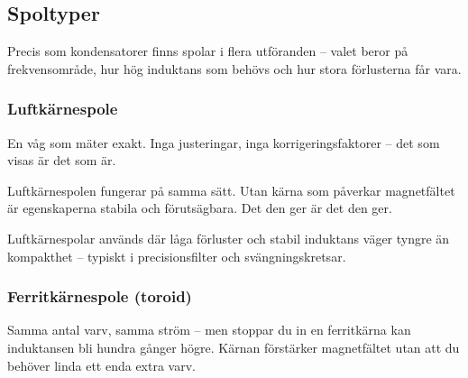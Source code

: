 \documentclass[a4paper,11pt,twoside]{book}
\newcommand{\emoji}[1]{{\emojifont #1}}
\begin{document}
\subsection{Spoltyper}

Precis som kondensatorer finns spolar i flera utföranden 
-- valet beror på frekvensområde, hur hög induktans som 
behövs och hur stora förlusterna får vara.

\subsubsection*{Luftkärnespole}

\begin{storybox}[{\emoji{🎯} Inga genvägar}]
En våg som mäter exakt. Inga justeringar, inga 
korrigeringsfaktorer -- det som visas är det som är.

Luftkärnespolen fungerar på samma sätt. Utan kärna 
som påverkar magnetfältet är egenskaperna stabila och 
förutsägbara. Det den ger är det den ger.
\end{storybox}

Luftkärnespolar används där låga förluster och stabil 
induktans väger tyngre än kompakthet -- typiskt i 
precisionsfilter och svängningskretsar.

\subsubsection*{Ferritkärnespole (toroid)}

Samma antal varv, samma ström -- men stoppar du in en 
ferritkärna kan induktansen bli hundra gånger högre. 
Kärnan förstärker magnetfältet utan att du behöver 
linda ett enda extra varv.
\end{document}
